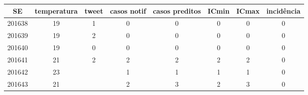 \begin{tabular}{c|ccccccc}
  \hline
SE & temperatura & tweet & casos notif & casos preditos & ICmin & ICmax & incidência \\ 
  \hline
201638 & 19 & 1 & 0 & 0 & 0 & 0 & 0 \\ 
  201639 & 19 & 2 & 0 & 0 & 0 & 0 & 0 \\ 
  201640 & 19 & 0 & 0 & 0 & 0 & 0 & 0 \\ 
  201641 & 21 & 2 & 2 & 2 & 2 & 2 & 0 \\ 
  201642 & 23 &  & 1 & 1 & 1 & 1 & 0 \\ 
  201643 & 21 &  & 2 & 3 & 2 & 3 & 0 \\ 
   \hline
\end{tabular}
